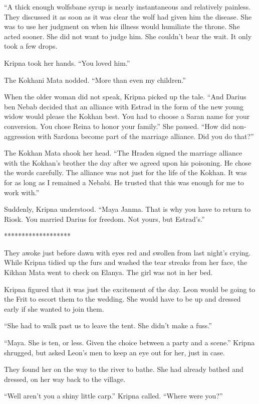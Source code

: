 \documentclass{article}
\begin{document}
	“A thick enough wolfsbane syrup is nearly instantaneous and relatively painless. They discussed it as soon as it was clear the wolf had given him the disease. She was to use her judgment on when his illness would humiliate the throne. She acted sooner. She did not want to judge him. She couldn’t bear the wait. It only took a few drops.
	
	Kripna took her hands. “You loved him.”
	
	The Kokhani Mata nodded. “More than even my children.”
	
	When the older woman did not speak, Kripna picked up the tale. “And Darius ben Nebab decided that an alliance with Estrad in the form of the new young widow would please the Kokhan best. You had to choose a Saran name for your conversion. You chose Reina to honor your family.” She paused. “How did non-aggression with Sardona become part of the marriage alliance. Did you do that?”
	
	The Kokhan Mata shook her head. “The Hraden signed the marriage alliance with the Kokhan’s brother the day after we agreed upon his poisoning. He chose the words carefully. The alliance was not just for the life of the Kokhan. It was for as long as I remained a Nebabi. He trusted that this was enough for me to work with.”
	
	Suddenly, Kripna understood. “Maya Janma. That is why you have to return to Riosk. You married Darius for freedom. Not yours, but Estrad’s.”
	
	*******************
	
	They awoke just before dawn with eyes red and swollen from last night’s crying. While Kripna tidied up the furs and washed the tear streaks from her face, the Kikhan Mata went to check on Elanya. The girl was not in her bed.
	
	Kripna figured that it was just the excitement of the day. Leon would be going to the Frit to escort them to the wedding. She would have to be up and dressed early if she wanted to join them. 
	
	“She had to walk past us to leave the tent. She didn’t make a fuss.” 
	
	“Maya. She is ten, or less. Given the choice between a party and a scene.” Kripna shrugged, but asked Leon’s men to keep an eye out for her, just in case.
	
	They found her on the way to the river to bathe. She had already bathed and dressed, on her way back to the village. 
	
	“Well aren’t you a shiny little carp.” Kripna called. “Where were you?” 
	
\end{document}
